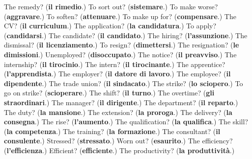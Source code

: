 \begin{tcolorbox}[breakable,colback=teal!4,colframe=teal!35!black,title={Before you move on}]
The remedy? (\textbf{il rimedio}.) To sort out? (\textbf{sistemare}.) To make worse? (\textbf{aggravare}.) To soften? (\textbf{attenuare}.) To make up for? (\textbf{compensare}.) The CV? (\textbf{il curriculum}.) The application? (\textbf{la candidatura}.) To apply? (\textbf{candidarsi}.) The candidate? (\textbf{il candidato}.) The hiring? (\textbf{l'assunzione}.) The dismissal? (\textbf{il licenziamento}.) To resign? (\textbf{dimettersi}.) The resignation? (\textbf{le dimissioni}.) Unemployed? (\textbf{disoccupato}.) The notice? (\textbf{il preavviso}.) The internship? (\textbf{il tirocinio}.) The intern? (\textbf{il tirocinante}.) The apprentice? (\textbf{l'apprendista}.) The employer? (\textbf{il datore di lavoro}.) The employee? (\textbf{il dipendente}.) The trade union? (\textbf{il sindacato}.) The strike? (\textbf{lo sciopero}.) To go on strike? (\textbf{scioperare}.) The shift? (\textbf{il turno}.) The overtime? (\textbf{gli straordinari}.) The manager? (\textbf{il dirigente}.) The department? (\textbf{il reparto}.) The duty? (\textbf{la mansione}.) The extension? (\textbf{la proroga}.) The delivery? (\textbf{la consegna}.) The rise? (\textbf{l'aumento}.) The qualification? (\textbf{la qualifica}.) The skill? (\textbf{la competenza}.) The training? (\textbf{la formazione}.) The consultant? (\textbf{il consulente}.) Stressed? (\textbf{stressato}.) Worn out? (\textbf{esaurito}.) The efficiency? (\textbf{l'efficienza}.) Efficient? (\textbf{efficiente}.) The productivity? (\textbf{la produttività}.)
\end{tcolorbox}
